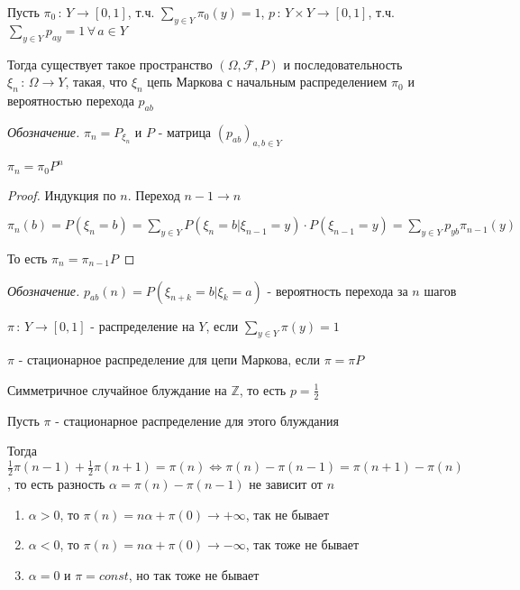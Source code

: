 \begin{theorem}
    Пусть $\pi_0 \, : \, Y \to [0, 1]$, т.ч. $\sum\limits_{y \in Y} \pi_0 (y) = 1$, $p \, : \, Y \times Y \to [0, 1]$, т.ч.
    $\sum\limits_{y \in Y} p_{ay} = 1 \, \forall \, a \in Y$

    Тогда существует такое пространство $(\Omega, \mathcal{F}, P)$ и последовательность $\xi_n \, : \, \Omega \to Y$, такая, что
    $\xi_n$ цепь Маркова с начальным распределением $\pi_0$ и вероятностью перехода $p_{ab}$
\end{theorem}

\textit{Обозначение. } $\pi_n = P_{\xi_n}$ и $P$ - матрица $(p_{ab})_{a, b \in Y}$

\begin{theorem}
    $\pi_n = \pi_0 P^n$
\end{theorem}

\begin{proof}
    Индукция по $n$. Переход $n-1 \to n$

    $\pi_n (b) = P(\xi_n = b) = \sum\limits_{y \in Y} P(\xi_n = b | \xi_{n-1} = y) \cdot P(\xi_{n-1} = y) = \sum\limits_{y \in Y}p_{yb} \pi_{n-1}(y)$

    То есть $\pi_n = \pi_{n-1} P$
\end{proof}

\textit{Обозначение. } $p_{ab} (n) = P(\xi_{n + k} = b | \xi_k = a)$ - вероятность перехода за $n$ шагов

\begin{definition}
    $\pi \, : \, Y \to [0, 1]$ - распределение на $Y$, если $\sum\limits_{y \in Y} \pi (y) = 1$
\end{definition}

\begin{definition}
    $\pi$ - стационарное распределение для цепи Маркова, если $\pi = \pi P$
\end{definition}

\begin{example}
    Симметричное случайное блуждание на $\mathbb{Z}$, то есть $p = \frac{1}{2}$

    Пусть $\pi$ - стационарное распределение для этого блуждания

    Тогда $\frac{1}{2} \pi (n - 1) + \frac{1}{2} \pi (n + 1) = \pi (n) \Longleftrightarrow \pi (n) - \pi (n - 1) = \pi (n + 1) - \pi (n)$, то есть разность $\alpha = \pi (n) - \pi (n - 1)$ не зависит от $n$

    \begin{enumerate}
        \item $\alpha > 0$, то $\pi (n) = n\alpha + \pi (0) \rightarrow +\infty$, так не бывает
        \item $\alpha < 0$, то $\pi (n) = n\alpha + \pi (0) \rightarrow -\infty$, так тоже не бывает
        \item $\alpha = 0$ и $\pi = const$, но так тоже не бывает 
    \end{enumerate}
\end{example}

